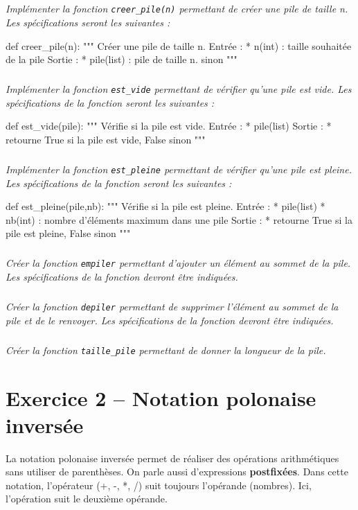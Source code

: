 \subparagraph{}\textit{Implémenter la fonction \texttt{creer\_pile(n)} permettant de créer une pile de taille n.  Les spécifications seront les suivantes :}
\begin{py}
\begin{python}
def creer_pile(n):
    """
    Créer une pile de taille n.
    Entrée : 
     * n(int) : taille souhaitée de la pile
    Sortie : 
     * pile(list) : pile de taille n.
     sinon
    """
\end{python}
\end{py}

\subparagraph{}\textit{Implémenter la fonction \texttt{est\_vide} permettant de vérifier qu'une pile est vide. Les spécifications de la fonction seront les suivantes : }
\begin{py}
\begin{python}
def est_vide(pile):
    """
    Vérifie si la pile est vide.
    Entrée : 
     * pile(list)
    Sortie : 
     * retourne True si la pile est vide, False 
     sinon
    """
\end{python}
\end{py}
\subparagraph{}\textit{Implémenter la fonction \texttt{est\_pleine} permettant de vérifier qu'une pile est pleine. Les spécifications de la fonction seront les suivantes :}
\begin{py}
\begin{python}
def est_pleine(pile,nb):
    """
    Vérifie si la pile est pleine.
    Entrée : 
     * pile(list)
     * nb(int) : nombre d'éléments maximum dans une pile
    Sortie : 
     * retourne True si la pile est pleine, False 
     sinon
    """
\end{python}
\end{py}
\subparagraph{}\textit{Créer la fonction \texttt{empiler} permettant d'ajouter un élément au sommet de la pile. Les spécifications de la fonction devront être indiquées.}

\subparagraph{}\textit{Créer la fonction \texttt{depiler} permettant de supprimer l'élément au sommet de la pile et de le renvoyer. Les spécifications de la fonction devront être indiquées.}

\subparagraph{}\textit{Créer la fonction \texttt{taille\_pile} permettant de donner la longueur de la pile.}


\section*{Exercice 2 -- Notation polonaise inversée}
\setcounter{exo}{0}
La notation polonaise inversée permet de réaliser des opérations arithmétiques sans utiliser de parenthèses. On parle aussi d'expressions \textbf{postfixées}. Dans cette notation, l'opérateur (+, -, *, /) suit toujours l'opérande (nombres). Ici, l'opération suit le deuxième opérande.


